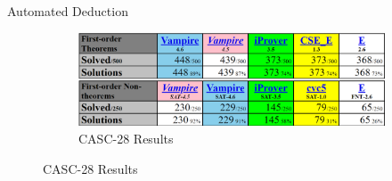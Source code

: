 \documentclass{cubeamer}
\begin{document}
\begin{frame}{Automated Deduction}
\begin{figure}[!tbp]
\begin{subfigure}[b]{0.35\textwidth}
				\end{subfigure}
				\hfill
				\begin{subfigure}[b]{0.6\textwidth}
					\includegraphics[width=\textwidth]{CASC.png}
					\caption{CASC-28 Results}
				\end{subfigure}
			\end{figure}
	\end{frame}
	
\end{document}
